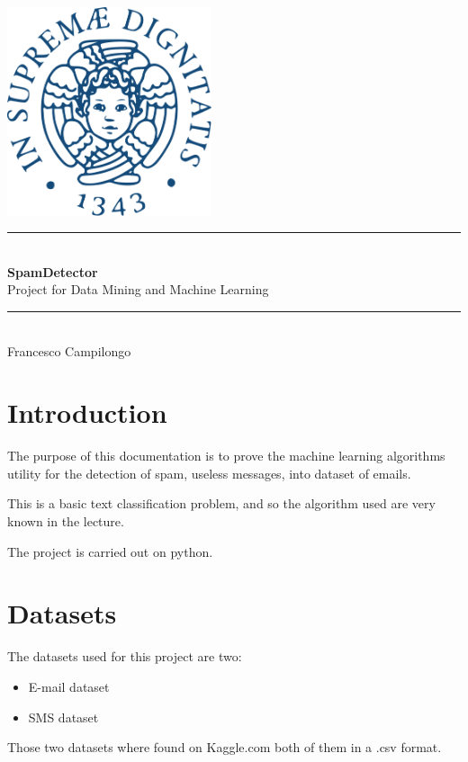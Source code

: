 \documentclass[a4paper]{report}
\newcommand{\HRule}{\rule{\linewidth}{0.5mm}}
\begin{document}
	\begin{titlepage}
		\begin{center}
			
			\includegraphics[width=0.45\textwidth]{img/unipi.png}~\\[2.5cm]
			
			
			\HRule \\[0.4cm]
			{ \LARGE 
				\textbf{SpamDetector}\\[0.4cm]
				{Project for Data Mining and Machine Learning}\\[0.4cm]
			}
			\HRule \\[1.5cm]
			
			
			
			{ \large
				Francesco Campilongo \\[0.1cm]
			}
			
			\vfill
			
		\end{center}
	\end{titlepage}

\tableofcontents
\chapter{Introduction}
The purpose of this documentation is to prove the machine learning algorithms utility for the detection of spam, useless messages, into dataset of emails.

\noindent This is a basic text classification problem, and so the algorithm used are very known in the lecture.

\noindent The project is carried out on python.
\chapter{Datasets}
The datasets used for this project are two:
\begin{itemize}
	\item E-mail dataset
	\item SMS dataset
\end{itemize}
Those two datasets where found on Kaggle.com both of them in a .csv format.
\end{document}
